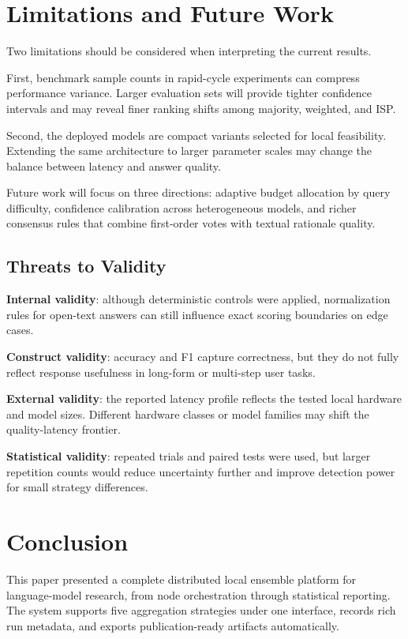 \documentclass[conference]{IEEEtran}
\begin{document}
\section{Limitations and Future Work}
Two limitations should be considered when interpreting the current results.

First, benchmark sample counts in rapid-cycle experiments can compress performance variance. Larger evaluation sets will provide tighter confidence intervals and may reveal finer ranking shifts among majority, weighted, and ISP.

Second, the deployed models are compact variants selected for local feasibility. Extending the same architecture to larger parameter scales may change the balance between latency and answer quality.

Future work will focus on three directions: adaptive budget allocation by query difficulty, confidence calibration across heterogeneous models, and richer consensus rules that combine first-order votes with textual rationale quality.

\subsection{Threats to Validity}
\textbf{Internal validity}: although deterministic controls were applied, normalization rules for open-text answers can still influence exact scoring boundaries on edge cases.

\textbf{Construct validity}: accuracy and F1 capture correctness, but they do not fully reflect response usefulness in long-form or multi-step user tasks.

\textbf{External validity}: the reported latency profile reflects the tested local hardware and model sizes. Different hardware classes or model families may shift the quality-latency frontier.

\textbf{Statistical validity}: repeated trials and paired tests were used, but larger repetition counts would reduce uncertainty further and improve detection power for small strategy differences.

\section{Conclusion}
This paper presented a complete distributed local ensemble platform for language-model research, from node orchestration through statistical reporting. The system supports five aggregation strategies under one interface, records rich run metadata, and exports publication-ready artifacts automatically.
\end{document}

